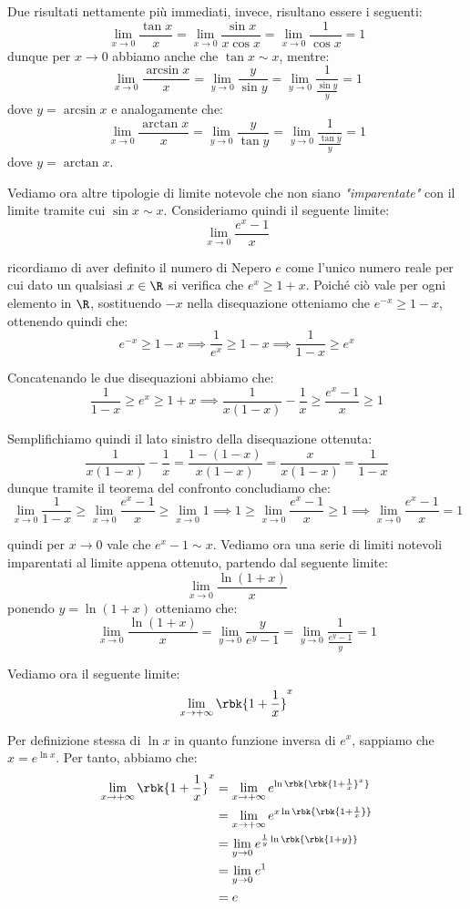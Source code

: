 \documentclass[a4paper, 12pt]{report}
\begin{document}
    Due risultati nettamente più immediati, invece, risultano essere i seguenti:
    \[\lim_{x \to 0} \frac{\tan x}{x} = \lim_{x \to 0} \frac{\sin x}{x \cos x} = \lim_{x \to 0} \frac{1}{\cos x} = 1\]
    dunque per $x \to 0$ abbiamo anche che $\tan x \sim x$, mentre:
    \[\lim_{x \to 0} \frac{\arcsin x}{x} = \lim_{y \to 0} \frac{y}{\sin y} = \lim_{y \to 0} \frac{1}{\frac{\sin y}{y}} = 1\]
    dove $y = \arcsin x$ e analogamente che:
    \[\lim_{x \to 0} \frac{\arctan x}{x} = \lim_{y \to 0} \frac{y}{\tan y} = \lim_{y \to 0} \frac{1}{\frac{\tan y}{y}} = 1\]
    dove $y = \arctan x$.

    Vediamo ora altre tipologie di limite notevole che non siano \textit{"imparentate"} con il limite tramite cui $\sin x \sim x$. Consideriamo quindi il seguente limite:
    \[\lim_{x \to 0} \frac{e^x-1}{x}\]

    ricordiamo di aver definito il numero di Nepero $e$ come l'unico numero reale per cui dato un qualsiasi $x \in \R$ si verifica che $e^x \geq 1 + x$. Poiché ciò vale per ogni elemento in $\R$, sostituendo $-x$ nella disequazione otteniamo che $e^{-x} \geq 1 - x$, ottenendo quindi che:
    \[e^{-x} \geq 1 - x \implies \frac{1}{e^x} \geq 1-x \implies \frac{1}{1-x} \geq e^x\]

    Concatenando le due disequazioni abbiamo che:
    \[\frac{1}{1-x} \geq e^x \geq 1 + x \implies \frac{1}{x(1-x)}-\frac{1}{x} \geq \frac{e^x-1}{x} \geq 1\]

    Semplifichiamo quindi il lato sinistro della disequazione ottenuta:
    \[\frac{1}{x(1-x)}-\frac{1}{x} = \frac{1-(1-x)}{x(1-x)} = \frac{x}{x(1-x)} = \frac{1}{1-x}\]
    dunque tramite il teorema del confronto concludiamo che:
    \[\lim_{x \to 0} \frac{1}{1-x} \geq \lim_{x \to 0} \frac{e^x-1}{x} \geq \lim_{x \to 0} 1 \implies 1 \geq \lim_{x \to 0} \frac{e^x-1}{x} \geq 1 \implies \lim_{x \to 0} \frac{e^x-1}{x} = 1\]

    quindi per $x \to 0$ vale che $e^x - 1 \sim x$. Vediamo ora una serie di limiti notevoli imparentati al limite appena ottenuto, partendo dal seguente limite:
    \[\lim_{x \to 0} \frac{\ln (1+x)}{x}\]
    ponendo $y = \ln (1+x)$ otteniamo che:
    \[\lim_{x \to 0} \frac{\ln (1+x)}{x} = \lim_{y \to 0} \frac{y}{e^y-1} = \lim_{y \to 0} \frac{1}{\frac{e^y-1}{y}} = 1\]

    Vediamo ora il seguente limite:
    \[\lim_{x \to +\infty} \rbk{1+\frac{1}{x}}^x\]

    Per definizione stessa di $\ln x$ in quanto funzione inversa di $e^x$, sappiamo che $x = e^{\ln x}$. Per tanto, abbiamo che:
    \[\begin{split}
        \lim_{x \to +\infty} \rbk{1+\frac{1}{x}}^x &= \lim_{x \to +\infty} e^{\ln \rbk{\rbk{1+\frac{1}{x}}^x}} \\
        &= \lim_{x \to +\infty} e^{x \ln \rbk{\rbk{1+\frac{1}{x}}}} \\
        &= \lim_{y \to 0} e^{\frac{1}{y} \ln \rbk{\rbk{1+y}}} \\
        &= \lim_{y \to 0} e^{1} \\
        &= e \\
    \end{split}\]
\end{document}
